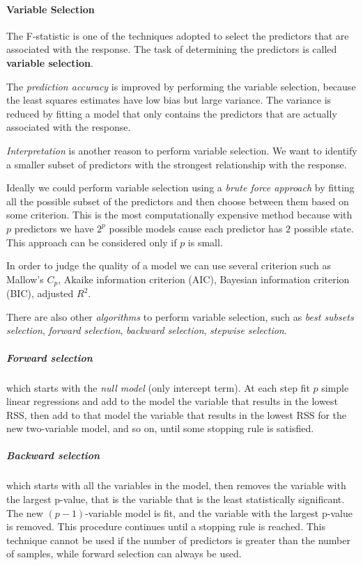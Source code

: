 \paragraph*{Variable Selection}
The F-statistic is one of the techniques adopted to select the predictors that are associated with the response. The task of determining the predictors is called \textbf{variable selection}.

The \textit{prediction accuracy} is improved by performing the variable selection, because the least squares estimates have low bias but large variance. The variance is reduced by fitting a model that only contains the predictors that are actually associated with the response.

\textit{Interpretation} is another reason to perform variable selection. We want to identify a smaller subset of predictors with the strongest relationship with the response.

Ideally we could perform variable selection using a \textit{brute force approach} by fitting all the possible subset of the predictors and then choose between them based on some criterion. This is the most computationally expensive method because with $p$ predictors we have $2^p$ possible models cause each predictor has $2$ possible state. This approach can be considered only if $p$ is small.

In order to judge the quality of a model we can use several criterion such as Mallow's $C_p$, Akaike information criterion (AIC), Bayesian information criterion (BIC), adjusted $R^2$.

There are also other \textit{algorithms} to perform variable selection, such as \textit{best subsets selection}, \textit{forward selection}, \textit{backward selection}, \textit{stepwise selection}.

\subparagraph*{Forward selection} which starts with the \textit{null model} (only intercept term). At each step fit $p$ simple linear regressions and add to the model the variable that results in the lowest RSS, then add to that model the variable that results in the lowest RSS for the new two-variable model, and so on, until some stopping rule is satisfied.

\subparagraph*{Backward selection} which starts with all the variables in the model, then removes the variable with the largest p-value, that is the variable that is the least statistically significant. The new $(p-1)$-variable model is fit, and the variable with the largest p-value is removed. This procedure continues until a stopping rule is reached. This technique cannot be used if the number of predictors is greater than the number of samples, while forward selection can always be used.

